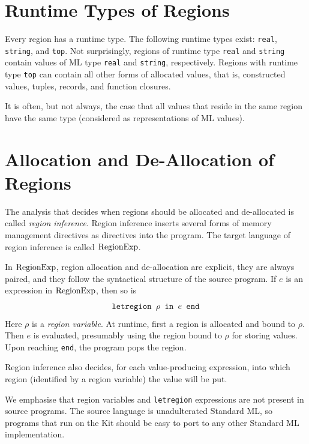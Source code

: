 \documentclass[12pt]{book}
\begin{document}
\section{Runtime Types of Regions}
\label{runtimetypes.sec}
Every region has a 
%
runtime type. The following runtime types exist: {\tt real}, {\tt
  string}, and {\tt top}. Not surprisingly, regions of runtime type
{\tt real} and {\tt string} contain values of ML type {\tt real} and
{\tt string}, respectively.  Regions with runtime type {\tt top} can
contain all other forms of allocated values, that is, constructed
values, tuples, records, and function closures.

It is often, but not always, the case that all values that reside in
the same region have the same type (considered as representations of
ML values).
 
\section{Allocation and De-Allocation of Regions}
\label{aldeal.sec}
The analysis that decides when regions should be allocated and
de-allocated is called {\em region inference}. Region inference
inserts several forms of memory management directives as directives
into the program.  The target language of region inference is called
%
$\hbox{\rm RegionExp}$.

In $\hbox{\rm RegionExp}$, region allocation and de-allocation are explicit, they
are always paired, and they follow the syntactical structure of the
source program.  If $e$ is an expression in $\hbox{\rm RegionExp}$, then so is
%
$$\hbox{\tt letregion $\rho$ in $e$ end}$$
Here $\rho$ is a 
%
{\em region variable}. At runtime, first a region is allocated and
bound to $\rho$. Then $e$ is evaluated, presumably using the region
bound to $\rho$ for storing values. Upon reaching {\tt end}, the
program pops the region.

Region inference also decides, for each value-producing expression,
into which region (identified by a region variable) the value will be
put.

We emphasise that region variables and {\tt letregion} expressions are
not present in source programs. The source language is unadulterated
Standard ML, so programs that run on the Kit should be easy to port to
any other Standard ML implementation.

\end{document}

